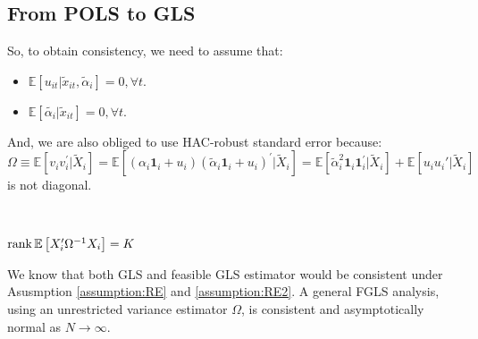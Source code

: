 \subsection{From POLS to GLS}

So, to obtain consistency, we need to assume that:
\begin{itemize}
    \item $\mathbb{E}[u_{it} | \tilde{x}_{it}, \tilde{\alpha}_i] = 0, \forall t$.
    \item $\mathbb{E}[\tilde{\alpha_i} | \tilde{x}_{it}] = 0, \forall t$.
\end{itemize}
And, we are also obliged to use HAC-robust standard error because:
\[\Omega \equiv \mathbb{E}[v_i v_i^{\prime} | \tilde{X}_i] = \mathbb{E}[(\alpha_i \mathbf{1}_i + u_i)(\tilde{\alpha}_i \mathbf{1}_i + u_i)^{\prime} | \tilde{X}_i] = \mathbb{E}[\tilde{\alpha}_i^2 \mathbf{1}_i \mathbf{1}_i^{\prime} | \tilde{X}_i] + \mathbb{E}[u_i u_i'| \tilde{X}_i] \]
is not diagonal.

\begin{assumption}\label{assumption:RE2}
    \

    $\operatorname{rank} \mathbb{E}\left[X_i^{\prime} \Omega^{-1} X_i \right] = K$
\end{assumption}
We know that both GLS and feasible GLS estimator would be consistent under Asusmption \ref{assumption:RE} and \ref{assumption:RE2}.
A general FGLS analysis, using an unrestricted variance estimator $\Omega$,
is consistent and asymptotically normal as $N \to \infty.$

